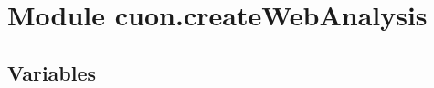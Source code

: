 %
%
%


\section{Module cuon.createWebAnalysis}

    \label{cuon:createWebAnalysis}


  \subsection{Variables}

